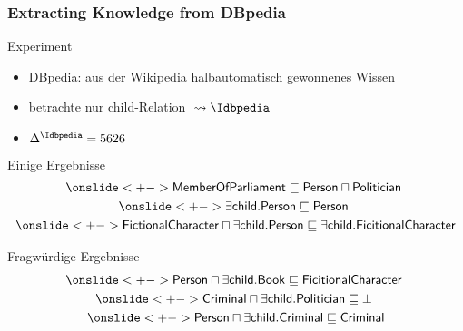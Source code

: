 \documentclass[ngerman]{beamer}
\begin{document}
\begin{frame}
  \frametitle{Extracting Knowledge from DBpedia}

  \onslide<+->
  
  \begin{block}{Experiment}
    \begin{itemize}
    \item<+-> DBpedia: aus der Wikipedia halbautomatisch gewonnenes Wissen
    \item<+-> betrachte nur \textsf{child}-Relation ${} \leadsto \Idbpedia$
    \item<+-> $\Delta^{\Idbpedia} = 5626$
    \end{itemize}
  \end{block}

  \onslide<+->

  \begin{block}{Einige Ergebnisse}
    \vspace*{-3ex}
    \begin{gather*}
      \onslide<+->{\sf MemberOfParliament \sqsubseteq Person \sqcap Politician}~\\
      \onslide<+->{\sf \exists child. Person \sqsubseteq Person}~\\
      \onslide<+->{\sf FictionalCharacter \sqcap \exists child. Person \sqsubseteq \exists
        child. FicitionalCharacter}
    \end{gather*}
  \end{block}

  \onslide<+->

  \vspace*{-3ex}
  \begin{block}{Fragwürdige Ergebnisse}
    \vspace*{-3ex}
    \begin{gather*}
      \onslide<+->{\sf Person \sqcap \exists child. Book \sqsubseteq
        FicitionalCharacter}~\\
      \onslide<+->{\sf Criminal \sqcap \exists child. Politician \sqsubseteq \bot}~\\
      \onslide<+->{\sf Person \sqcap \exists child. Criminal \sqsubseteq Criminal}
    \end{gather*}
  \end{block}

\end{frame}
\end{document}
